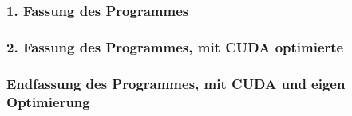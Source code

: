 \subsubsection*{1. Fassung des Programmes}
\bigskip
\subsubsection*{2. Fassung des Programmes, mit CUDA optimierte}
\bigskip
\subsubsection*{Endfassung des Programmes, mit CUDA und eigen Optimierung}
